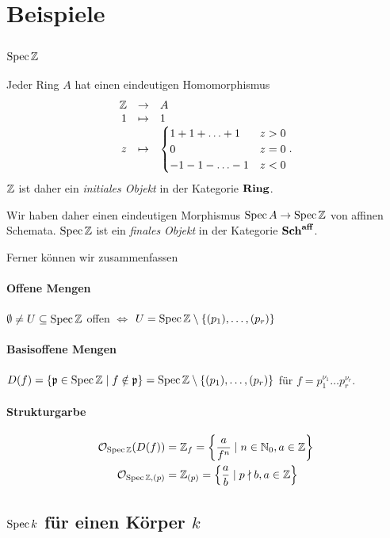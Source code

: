 \section{Beispiele}

\subsection{$\operatorname{Spec} \mathbb{Z}$}

Jeder Ring $A$ hat einen eindeutigen Homomorphismus
\[
	\funcdef{
		\Z & \to & A\\
		 1 & \mapsto & 1\\
		 z & \mapsto & \begin{cases} 1 + 1 + \ldots + 1 & z > 0\\
		 	0 & z = 0\\
		 	-1 -1 - \ldots- 1 & z < 0
		 \end{cases}.}
\]
$\mathbb{Z}$ ist daher ein \emph{initiales Objekt} in der Kategorie $\mathbf{Ring}$.

Wir haben daher einen eindeutigen Morphismus $\operatorname{Spec} A \to \operatorname{Spec} \mathbb{Z}$ von
affinen Schemata. $\operatorname{Spec} \mathbb{Z}$ ist ein \emph{finales Objekt} in
der Kategorie $\mathbf{Sch}^{\mathbf{aff}}$.

Ferner können wir zusammenfassen
\paragraph{Offene Mengen}
	$\emptyset \neq U\subseteq \operatorname{Spec} \mathbb{Z}$ offen 
	$\Leftrightarrow$ $U = \operatorname{Spec} \mathbb{Z} \setminus \{(p_1),\ldots,(p_r)\}$
	
\paragraph{Basisoffene Mengen}
	$D(f) = \{\mathfrak{p} \in \operatorname{Spec}\mathbb{Z} \mid f \notin \mathfrak{p}\} = 
	\operatorname{Spec}\mathbb{Z} \setminus \{(p_1),\ldots,(p_r)\}$ für 
	$f = p_1^{\nu_1}\ldots p_r^{\nu_r}$.
	
\paragraph{Strukturgarbe}
	\begin{align*}
		\mathcal{O}_{\operatorname{Spec}\mathbb{Z}} (D(f)) &= \mathbb{Z}_f  = 
			\left\{ \frac{a}{f^n} \mid n\in \mathbb{N}_0, a\in \mathbb{Z}\right\} \\
		\mathcal{O}_{\operatorname{Spec}\mathbb{Z}, (p)} &= \mathbb{Z}_{(p)} = 
			\left\{ \frac{a}{b} \mid p\nmid b, a\in \mathbb{Z}\right\} 
 	\end{align*}

\subsection{$\operatorname{Spec} k$ für einen Körper $k$}
